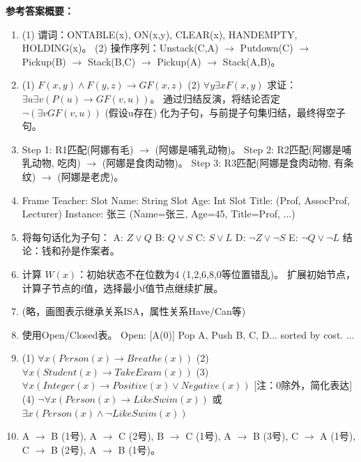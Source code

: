 \textbf{参考答案概要：}
\begin{enumerate}[label=\arabic*.]
\item 
(1) 谓词：ONTABLE(x), ON(x,y), CLEAR(x), HANDEMPTY, HOLDING(x)。
(2) 操作序列：Unstack(C,A) $\to$ Putdown(C) $\to$ Pickup(B) $\to$ Stack(B,C) $\to$ Pickup(A) $\to$ Stack(A,B)。
\item 
(1) $F(x,y) \land F(y,z) \to GF(x,z)$
(2) $\forall y \exists x F(x,y)$
求证：$\exists u \exists v (P(u) \to GF(v,u))$。
通过归结反演，将结论否定 $\neg (\exists v GF(v,u))$ (假设u存在) 化为子句，与前提子句集归结，最终得空子句。
\item 
Step 1: R1匹配(阿娜有毛) $\to$ (阿娜是哺乳动物)。
Step 2: R2匹配(阿娜是哺乳动物, 吃肉) $\to$ (阿娜是食肉动物)。
Step 3: R3匹配(阿娜是食肉动物, 有条纹) $\to$ (阿娜是老虎)。
\item 
Frame Teacher:
  Slot Name: String
  Slot Age: Int
  Slot Title: (Prof, AssocProf, Lecturer)
  Instance: 张三 (Name=张三, Age=45, Title=Prof, ...)
\item 
将每句话化为子句：
A: $Z \lor Q$
B: $Q \lor S$
C: $S \lor L$
D: $\neg Z \lor \neg S$
E: $\neg Q \lor \neg L$
结论：钱和孙是作案者。
\item 
计算 $W(x)$：初始状态不在位数为4 (1,2,6,8,0等位置错乱)。
扩展初始节点，计算子节点的f值，选择最小f值节点继续扩展。
\item 
(略，画图表示继承关系ISA，属性关系Have/Can等)
\item 
使用Open/Closed表。
Open: [A(0)]
Pop A, Push B, C, D... sorted by cost.
...
\item 
(1) $\forall x (Person(x) \to Breathe(x))$
(2) $\forall x (Student(x) \to TakeExam(x))$
(3) $\forall x (Integer(x) \to Positive(x) \lor Negative(x))$ [注：0除外，简化表达]
(4) $\neg \forall x (Person(x) \to LikeSwim(x))$ 或 $\exists x (Person(x) \land \neg LikeSwim(x))$
\item 
A $\to$ B (1号), A $\to$ C (2号), B $\to$ C (1号), A $\to$ B (3号), C $\to$ A (1号), C $\to$ B (2号), A $\to$ B (1号)。
\end{enumerate}
